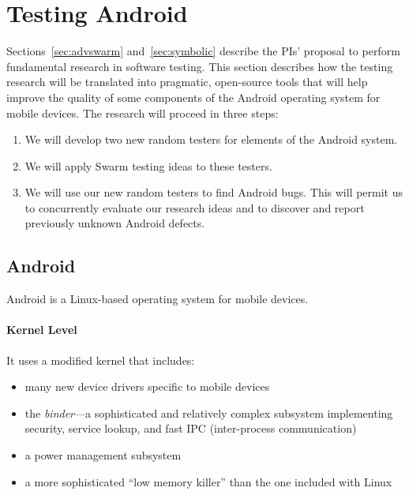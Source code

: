 \section{Testing Android}


Sections~\ref{sec:advswarm} and~\ref{sec:symbolic} describe the PIs'
proposal to perform fundamental research in software testing.
%
This section describes how the testing research will be translated
into pragmatic, open-source tools that will help improve the quality
of some components of the Android operating system for mobile devices.
%
The research will proceed in three steps:
%
\begin{enumerate}
%
\item 
%
We will develop two new random testers for elements of the
  Android system.
%
\item
%
We will apply Swarm testing ideas to these testers.
%
\item 
%
We will use our new random testers to find Android bugs. This
  will permit us to concurrently evaluate our research ideas and to
  discover and report previously unknown Android defects.
%
\end{enumerate}


\subsection{Android}

Android is a Linux-based operating system for mobile devices.

\paragraph{Kernel Level}

It uses a modified kernel that includes:
%
\begin{itemize}
\item
many new device drivers specific to mobile devices
\item 
the \emph{binder}---a sophisticated and relatively complex
  subsystem implementing security, service lookup, and fast IPC
  (inter-process communication)
\item
a power management subsystem
\item
a more sophisticated ``low memory killer'' than the one included
with Linux
\end{itemize}




